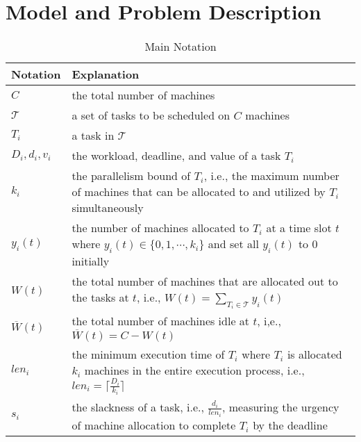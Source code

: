 \documentclass[10pt,journal,compsoc]{IEEEtran}
\begin{document}
\section{Model and Problem Description}
\label{sec.model}





\begin{table}
\centering
\begin{threeparttable}[!ht]

\caption{Main Notation}
\begin{tabular}{|C{1.5cm}|C{6.2cm}|}
\hline

   Notation & Explanation\\ \hline

$C$ & the total number of machines \\ \hline

$\mathcal{T}$ & a set of tasks to be scheduled on $C$ machines \\ \hline

$T_{i}$ & a task in $\mathcal{T}$ \\ \hline

$D_{i}, d_{i}, v_{i}$ & the workload, deadline, and value of a task $T_{i}$ \\ \hline

$k_i$ & the parallelism bound of $T_{i}$, i.e., the maximum number of machines that can be allocated to and utilized by $T_{i}$ simultaneously \\ \hline

$y_{i}(t)$ & the number of machines allocated to $T_{i}$ at a time slot $t$ where $y_{i}(t)\in \{0,1,\cdots,k_{i}\}$ and set all $y_{i}(t)$ to $0$ initially \\ \hline

$W(t)$ & the total number of machines that are allocated out to the tasks at $t$, i.e., $W(t)=\sum_{T_{i}\in\mathcal{T}}{y_{i}(t)}$ \\ \hline

$\overline{W}(t)$ &  the total number of machines idle at $t$, i,e., $\overline{W}(t) = C - W(t)$ \\ \hline


$len_{i}$ & the minimum execution time of $T_{i}$ where $T_{i}$ is allocated $k_{i}$ machines in the entire execution process, i.e., $len_{i}=\lceil \frac{D_{i}}{k_{i}} \rceil$\\ \hline

$s_{i}$ & the slackness of a task, i.e., $\frac{d_{i}}{len_{i}}$, measuring the urgency of machine allocation to complete $T_{i}$ by the deadline \\ \hline


\end{tabular}
\end{threeparttable}
\end{table}
\end{document}
